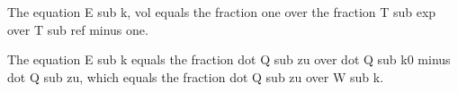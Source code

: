 The equation E sub k, vol equals the fraction one over the fraction T sub exp over T sub ref minus one.

The equation E sub k equals the fraction dot Q sub zu over dot Q sub k0 minus dot Q sub zu, which equals the fraction dot Q sub zu over W sub k.